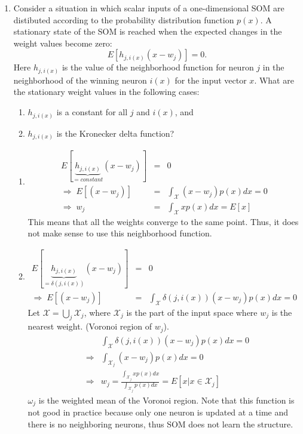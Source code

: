 \begin{enumerate}
  
\item Consider a situation in which scalar inputs of a
  one-dimensional SOM are distibuted according to the probability
  distribution function $p(x)$. A stationary state
  of the SOM is reached when the expected changes in the weight
  values become zero:
  \begin{equation*}
    E[h_{j,i(x)}(x-w_j)]=0 \mbox{.}
  \end{equation*}
  Here $h_{j,i(x)}$ is the value of the neighborhood function for neuron $j$ in the neighborhood
  of the winning neuron $i(x)$ for the input vector $x$.
  What are the stationary weight values in the following cases: \begin{enumerate}
  \item $h_{j,i(x)}$ is a constant for all $j$ and $i(x)$, and
  \item $h_{j,i(x)}$ is the Kronecker delta function?
  \end{enumerate}

  \begin{solution}

    \begin{enumerate}
    \item
      \begin{eqnarray*}
        E[\underbrace{h_{j,i(x)}}_{=constant}(x-w_j)]&=&0\\
        \Rightarrow\;E[(x-w_j)]&=&\int_\mathcal{X}(x-w_j)p(x)dx=0\\
        \Rightarrow\;w_j&=&\int_\mathcal{X}xp(x)dx=E[x]
      \end{eqnarray*}
      This means that all the weights converge to the same point.
      Thus, it does not make sense to use this neighborhood function.

    \item
      \begin{eqnarray*}
        E[\underbrace{h_{j,i(x)}}_{=\delta(j,i(x))}(x-w_j)]&=&0\\
        \Rightarrow\;E[(x-w_j)]&=&\int_\mathcal{X}\delta(j,i(x))(x-w_j)p(x)dx=0
      \end{eqnarray*}
      Let $\mathcal{X}=\bigcup_j\mathcal{X}_j$, where $\mathcal{X}_j$ is the part
      of the input space where $w_j$ is the nearest weight. (Voronoi region
      of $w_j$).
      \begin{eqnarray*}
        & &\int_\mathcal{X}\delta(j,i(x))(x-w_j)p(x)dx=0 \\
        &\Rightarrow&\int_{\mathcal{X}_j}(x-w_j)p(x)dx=0\\
        &\Rightarrow&w_j=\frac{\int_{\mathcal{X}_j}xp(x)dx}{\int_{\mathcal{X}_j}p(x)dx}
        = E[x|x \in \mathcal{X}_j]
      \end{eqnarray*}
      $\omega_j$ is the weighted mean of the Voronoi region.  Note
      that this function is not good in practice because only one
      neuron is updated at a time and there is no neighboring neurons,
      thus SOM does not learn the structure.
    \end{enumerate}
  \end{solution}


\end{enumerate}
